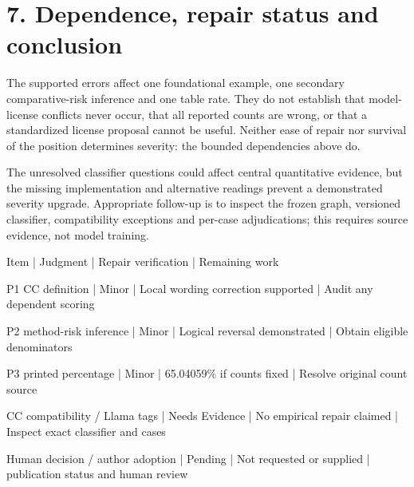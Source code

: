 \documentclass[10pt]{article}
\begin{document}
\section*{7. Dependence, repair status and conclusion}
The supported errors affect one foundational example, one secondary comparative-risk inference and one table rate. They do not establish that model-license conflicts never occur, that all reported counts are wrong, or that a standardized license proposal cannot be useful. Neither ease of repair nor survival of the position determines severity: the bounded dependencies above do.\par
The unresolved classifier questions could affect central quantitative evidence, but the missing implementation and alternative readings prevent a demonstrated severity upgrade. Appropriate follow-up is to inspect the frozen graph, versioned classifier, compatibility exceptions and per-case adjudications; this requires source evidence, not model training.\par
Item | Judgment | Repair verification | Remaining work\par
P1 CC definition | Minor | Local wording correction supported | Audit any dependent scoring\par
P2 method-risk inference | Minor | Logical reversal demonstrated | Obtain eligible denominators\par
P3 printed percentage | Minor | 65.04059\% if counts fixed | Resolve original count source\par
CC compatibility / Llama tags | Needs Evidence | No empirical repair claimed | Inspect exact classifier and cases\par
Human decision / author adoption | Pending | Not requested or supplied | publication status and human review\par
\end{document}
